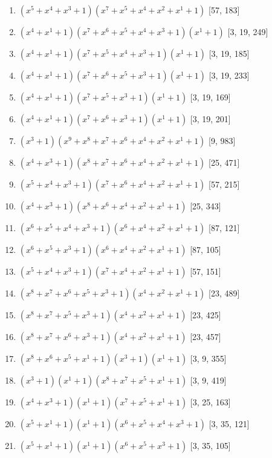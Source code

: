\documentclass[10pt,twocolumn]{article}
\begin{document}
\begin{enumerate}
\item $(x^{5} + x^{4} + x^{3} + 1)(x^{7} + x^{5} + x^{4} + x^{2} + x^{1} + 1)$  [57, 183]
\item $(x^{4} + x^{1} + 1)(x^{7} + x^{6} + x^{5} + x^{4} + x^{3} + 1)(x^{1} + 1)$  [3, 19, 249]
\item $(x^{4} + x^{1} + 1)(x^{7} + x^{5} + x^{4} + x^{3} + 1)(x^{1} + 1)$  [3, 19, 185]
\item $(x^{4} + x^{1} + 1)(x^{7} + x^{6} + x^{5} + x^{3} + 1)(x^{1} + 1)$  [3, 19, 233]
\item $(x^{4} + x^{1} + 1)(x^{7} + x^{5} + x^{3} + 1)(x^{1} + 1)$  [3, 19, 169]
\item $(x^{4} + x^{1} + 1)(x^{7} + x^{6} + x^{3} + 1)(x^{1} + 1)$  [3, 19, 201]
\item $(x^{3} + 1)(x^{9} + x^{8} + x^{7} + x^{6} + x^{4} + x^{2} + x^{1} + 1)$  [9, 983]
\item $(x^{4} + x^{3} + 1)(x^{8} + x^{7} + x^{6} + x^{4} + x^{2} + x^{1} + 1)$  [25, 471]
\item $(x^{5} + x^{4} + x^{3} + 1)(x^{7} + x^{6} + x^{4} + x^{2} + x^{1} + 1)$  [57, 215]
\item $(x^{4} + x^{3} + 1)(x^{8} + x^{6} + x^{4} + x^{2} + x^{1} + 1)$  [25, 343]
\item $(x^{6} + x^{5} + x^{4} + x^{3} + 1)(x^{6} + x^{4} + x^{2} + x^{1} + 1)$  [87, 121]
\item $(x^{6} + x^{5} + x^{3} + 1)(x^{6} + x^{4} + x^{2} + x^{1} + 1)$  [87, 105]
\item $(x^{5} + x^{4} + x^{3} + 1)(x^{7} + x^{4} + x^{2} + x^{1} + 1)$  [57, 151]
\item $(x^{8} + x^{7} + x^{6} + x^{5} + x^{3} + 1)(x^{4} + x^{2} + x^{1} + 1)$  [23, 489]
\item $(x^{8} + x^{7} + x^{5} + x^{3} + 1)(x^{4} + x^{2} + x^{1} + 1)$  [23, 425]
\item $(x^{8} + x^{7} + x^{6} + x^{3} + 1)(x^{4} + x^{2} + x^{1} + 1)$  [23, 457]
\item $(x^{8} + x^{6} + x^{5} + x^{1} + 1)(x^{3} + 1)(x^{1} + 1)$  [3, 9, 355]
\item $(x^{3} + 1)(x^{1} + 1)(x^{8} + x^{7} + x^{5} + x^{1} + 1)$  [3, 9, 419]
\item $(x^{4} + x^{3} + 1)(x^{1} + 1)(x^{7} + x^{5} + x^{1} + 1)$  [3, 25, 163]
\item $(x^{5} + x^{1} + 1)(x^{1} + 1)(x^{6} + x^{5} + x^{4} + x^{3} + 1)$  [3, 35, 121]
\item $(x^{5} + x^{1} + 1)(x^{1} + 1)(x^{6} + x^{5} + x^{3} + 1)$  [3, 35, 105]

\end{enumerate}
\end{document}
